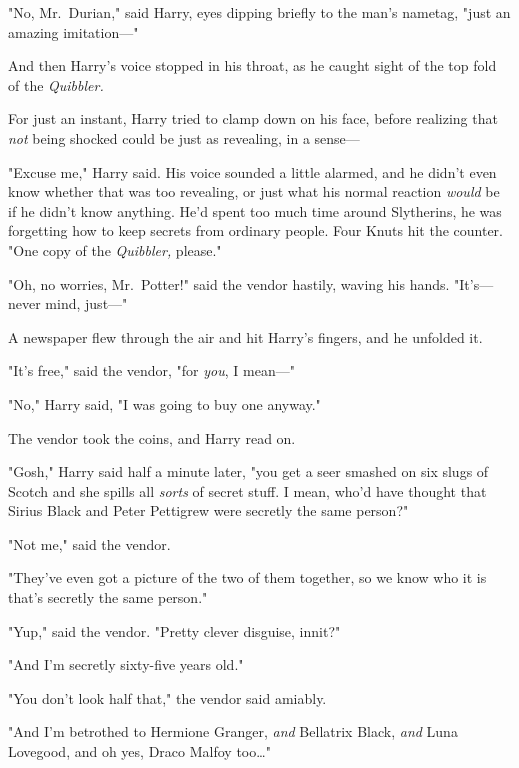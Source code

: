 "No, Mr.~Durian," said Harry, eyes dipping briefly to the man's nametag, "just 
an amazing imitation---"

And then Harry's voice stopped in his throat, as he caught sight of the top 
fold of the \emph{Quibbler.}


For just an instant, Harry tried to clamp down on his face, before realizing 
that \emph{not} being shocked could be just as revealing, in a sense---

"Excuse me," Harry said. His voice sounded a little alarmed, and he didn't even 
know whether that was too revealing, or just what his normal reaction 
\emph{would} be if he didn't know anything. He'd spent too much time around 
Slytherins, he was forgetting how to keep secrets from ordinary people. Four 
Knuts hit the counter. "One copy of the \emph{Quibbler,} please."

"Oh, no worries, Mr.~Potter!" said the vendor hastily, waving his hands. 
"It's---never mind, just---"

A newspaper flew through the air and hit Harry's fingers, and he unfolded it.


"It's free," said the vendor, "for \emph{you}, I mean---"

"No," Harry said, "I was going to buy one anyway."

The vendor took the coins, and Harry read on.

"Gosh," Harry said half a minute later, "you get a seer smashed on six slugs of 
Scotch and she spills all \emph{sorts} of secret stuff. I mean, who'd have 
thought that Sirius Black and Peter Pettigrew were secretly the same person?"

"Not me," said the vendor.

"They've even got a picture of the two of them together, so we know who it is 
that's secretly the same person."

"Yup," said the vendor. "Pretty clever disguise, innit?"

"And I'm secretly sixty-five years old."

"You don't look half that," the vendor said amiably.

"And I'm betrothed to Hermione Granger, \emph{and} Bellatrix Black, \emph{and} 
Luna Lovegood, and oh yes, Draco Malfoy too{\ldots}"

